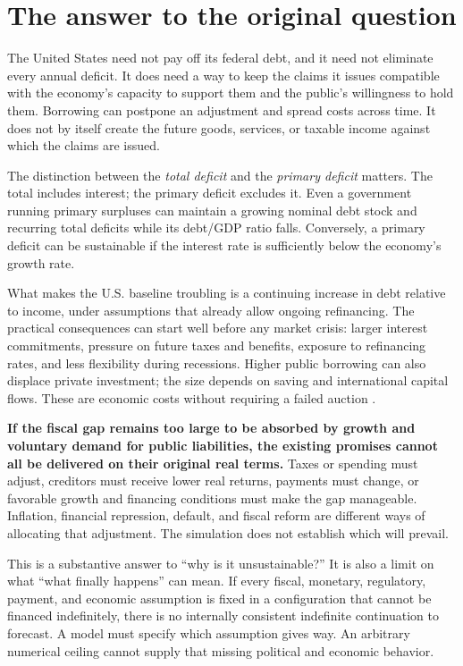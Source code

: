 \documentclass[11pt]{article}
\begin{document}
\section{The answer to the original question}

The United States need not pay off its federal debt, and it need not eliminate every annual
deficit. It does need a way to keep the claims it issues compatible with the economy's
capacity to support them and the public's willingness to hold them. Borrowing can postpone
an adjustment and spread costs across time. It does not by itself create the future goods,
services, or taxable income against which the claims are issued.

The distinction between the \emph{total deficit} and the \emph{primary deficit} matters.
The total includes interest; the primary deficit excludes it. Even a government running
primary surpluses can maintain a growing nominal debt stock and recurring total deficits
while its debt/GDP ratio falls. Conversely, a primary deficit can be sustainable if the
interest rate is sufficiently below the economy's growth rate.

What makes the U.S. baseline troubling is a continuing increase in debt relative to income,
under assumptions that already allow ongoing refinancing. The practical consequences can
start well before any market crisis: larger interest commitments, pressure on future taxes
and benefits, exposure to refinancing rates, and less flexibility during recessions. Higher
public borrowing can also displace private investment; the size depends on saving and
international capital flows. These are economic costs without requiring a failed auction
\cite{bernankeSustainability}.

\textbf{If the fiscal gap remains too large to be absorbed by growth and voluntary demand
for public liabilities, the existing promises cannot all be delivered on their original
real terms.} Taxes or spending must adjust, creditors must receive lower real returns,
payments must change, or favorable growth and financing conditions must make the gap
manageable. Inflation, financial repression, default, and fiscal reform are different
ways of allocating that adjustment. The simulation does not establish which will prevail.

This is a substantive answer to ``why is it unsustainable?'' It is also a limit on what
``what finally happens'' can mean. If every fiscal, monetary, regulatory, payment, and
economic assumption is fixed in a configuration that cannot be financed indefinitely,
there is no internally consistent indefinite continuation to forecast. A model must specify
which assumption gives way. An arbitrary numerical ceiling cannot supply that missing
political and economic behavior.
\end{document}
